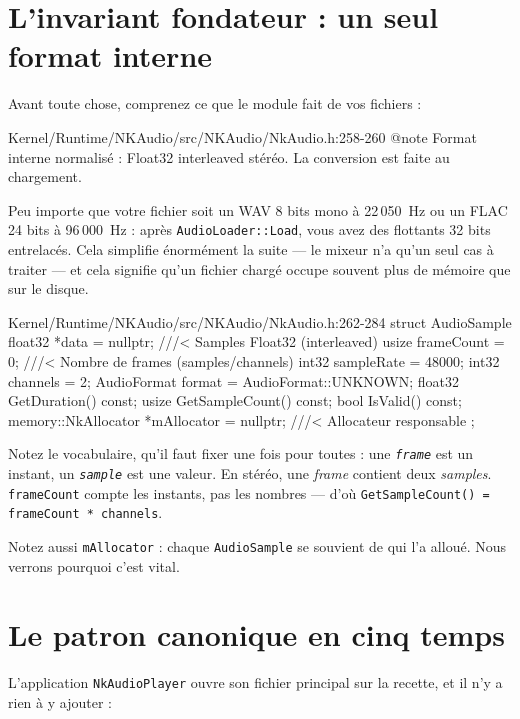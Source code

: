 \section{L'invariant fondateur : un seul format interne}

Avant toute chose, comprenez ce que le module fait de vos fichiers :

\begin{nkcode}{Kernel/Runtime/NKAudio/src/NKAudio/NkAudio.h:258-260}
 @note Format interne normalisé : Float32 interleaved stéréo.
       La conversion est faite au chargement.
\end{nkcode}

Peu importe que votre fichier soit un WAV 8 bits mono à 22\,050~Hz ou un FLAC
24 bits à 96\,000~Hz : après \texttt{AudioLoader::Load}, vous avez des flottants
32 bits entrelacés. Cela simplifie énormément la suite — le mixeur n'a qu'un seul
cas à traiter — et cela signifie qu'un fichier chargé occupe souvent plus de
mémoire que sur le disque.

\begin{nkcode}{Kernel/Runtime/NKAudio/src/NKAudio/NkAudio.h:262-284}
    struct AudioSample {
            float32 *data = nullptr;   ///< Samples Float32 (interleaved)
            usize frameCount = 0;      ///< Nombre de frames (samples/channels)
            int32 sampleRate = 48000;
            int32 channels = 2;
            AudioFormat format = AudioFormat::UNKNOWN;
            float32 GetDuration() const;
            usize   GetSampleCount() const;
            bool    IsValid() const;
            memory::NkAllocator *mAllocator = nullptr; ///< Allocateur responsable
    };
\end{nkcode}

Notez le vocabulaire, qu'il faut fixer une fois pour toutes : une
\emph{\texttt{frame}} est un instant, un \emph{\texttt{sample}} est une valeur.
En stéréo, une \emph{frame} contient deux \emph{samples}. \texttt{frameCount}
compte les instants, pas les nombres — d'où
\texttt{GetSampleCount() = frameCount * channels}.

Notez aussi \texttt{mAllocator} : chaque \texttt{AudioSample} se souvient de qui
l'a alloué. Nous verrons pourquoi c'est vital.

\section{Le patron canonique en cinq temps}

L'application \texttt{NkAudioPlayer} ouvre son fichier principal sur la recette,
et il n'y a rien à y ajouter :

